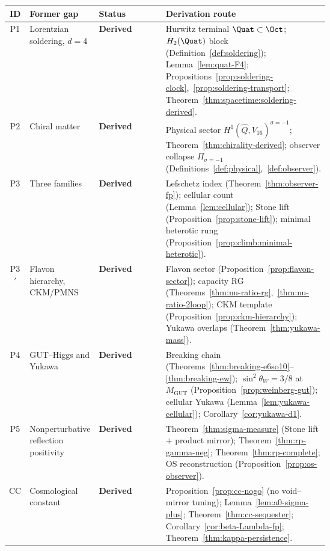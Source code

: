 \begin{table}[ht]
\centering
\small
\renewcommand{\arraystretch}{1.12}
\begin{tabular}{@{}clp{0.22\linewidth}p{0.40\linewidth}@{}}
\toprule
\textbf{ID} & \textbf{Former gap} & \textbf{Status} & \textbf{Derivation route} \\
\midrule
P1 &
  Lorentzian soldering, $d=4$ &
  \textbf{Derived} &
  Hurwitz terminal $\Quat\subset\Oct$; $H_2(\Quat)$ block
  (Definition~\ref{def:soldering}); Lemma~\ref{lem:quat-F4};
  Propositions~\ref{prop:soldering-clock},~\ref{prop:soldering-transport};
  Theorem~\ref{thm:spacetime:soldering-derived}. \\
\addlinespace
P2 &
  Chiral matter &
  \textbf{Derived} &
  Physical sector $H^1(\hat Q,V_{16})^{\sigma=-1}$;
  Theorem~\ref{thm:chirality-derived}; observer collapse
  $\Pi_{\sigma=-1}$ (Definitions~\ref{def:physical},~\ref{def:observer}). \\
\addlinespace
P3 &
  Three families &
  \textbf{Derived} &
  Lefschetz index (Theorem~\ref{thm:observer-fp});
  cellular count (Lemma~\ref{lem:cellular}); Stone lift
  (Proposition~\ref{prop:stone-lift}); minimal heterotic rung
  (Proposition~\ref{prop:climb:minimal-heterotic}). \\
\addlinespace
P3$'$ &
  Flavon hierarchy, CKM/PMNS &
  \textbf{Derived} &
  Flavon sector (Proposition~\ref{prop:flavon-sector});
  capacity RG (Theorems~\ref{thm:nu-ratio-rg},~\ref{thm:nu-ratio-2loop});
  CKM template (Proposition~\ref{prop:ckm-hierarchy});
  Yukawa overlaps (Theorem~\ref{thm:yukawa-mass}). \\
\addlinespace
P4 &
  GUT--Higgs and Yukawa &
  \textbf{Derived} &
  Breaking chain (Theorems~\ref{thm:breaking-e6so10}--\ref{thm:breaking-ew});
  $\sin^2\theta_W=3/8$ at $M_{\mathrm{GUT}}$ (Proposition~\ref{prop:weinberg-gut});
  cellular Yukawa (Lemma~\ref{lem:yukawa-cellular});
  Corollary~\ref{cor:yukawa-d1}. \\
\addlinespace
P5 &
  Nonperturbative reflection positivity &
  \textbf{Derived} &
  Theorem~\ref{thm:sigma-measure} (Stone lift $+$ product mirror);
  Theorem~\ref{thm:rp-gamma-neg}; Theorem~\ref{thm:rp-complete};
  OS reconstruction (Proposition~\ref{prop:os-observer}). \\
\addlinespace
CC &
  Cosmological constant &
  \textbf{Derived} &
  Proposition~\ref{prop:cc-nogo} (no void--mirror tuning);
  Lemma~\ref{lem:a0-sigma-plus}; Theorem~\ref{thm:cc-sequester};
  Corollary~\ref{cor:beta-Lambda-fp};
  Theorem~\ref{thm:kappa-persistence}. \\

\end{tabular}
\end{table}
